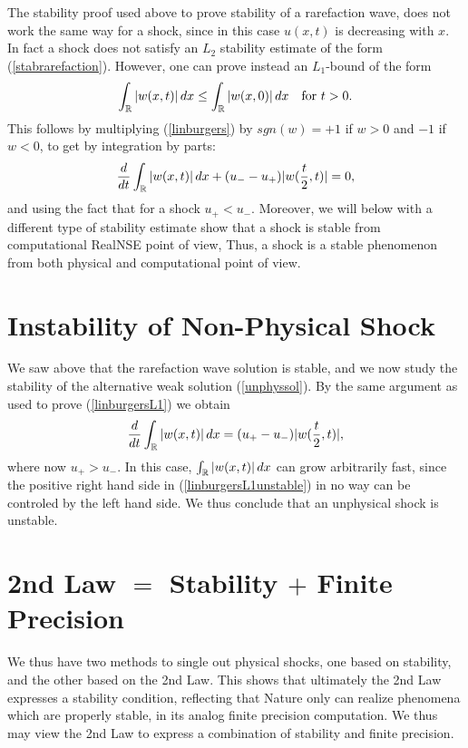 The stability proof used above to prove stability of a rarefaction
wave, does not work the same way for a shock, since in this case
$u(x,t)$ is decreasing with $x$. In fact a shock does not satisfy an
$L_2$ stability estimate of the form (\ref{stabrarefaction}). However,
one can prove instead an $L_1$-bound of the form
\begin{equation}\label{stabshock}
\int_{\mathbb{R}} \vert w(x,t)\vert\, dx\le \int_{\mathbb{R}} \vert w(x,0)\vert
\, dx\quad\mbox{for }t>0.
\end{equation}
This follows by multiplying (\ref{linburgers}) by $sgn (w)=+1$ if $w>0$ 
and $-1$ if $w<0$, to get by integration by parts:
\begin{equation}\label{linburgersL1}
\frac{d}{dt}
\int_{\mathbb{R}}\vert w(x,t)\vert\, dx +(u_--u_+)\vert w(\frac{t}{2},t)\vert =0,
\end{equation}
and using the fact that for a shock $u_+<u_-$.
Moreover, we will below with a different type of stability estimate
show that a shock is stable from computational RealNSE point of view, 
Thus, a shock is a stable phenomenon from both physical and computational
point of view.


\section{Instability of Non-Physical Shock}

We saw above that the rarefaction wave solution is stable, and we now
study the stability of the alternative weak solution (\ref{unphyssol}).
By the same argument as used to prove (\ref{linburgersL1}) we obtain
\begin{equation}\label{linburgersL1unstable}
\frac{d}{dt}\int_{\mathbb{R}}\vert w(x,t)\vert\, dx =(u_+-u_-)\vert w(\frac{t}{2},t)\vert , 
\end{equation}
where now $u_+>u_-$. In this case, $\int_{\mathbb{R}}\vert w(x,t)\vert\, dx$
can grow arbitrarily fast, since the positive right hand side
in (\ref{linburgersL1unstable}) in no way can
be controled by the left hand side. We thus conclude that an 
unphysical shock is unstable.

\section{2nd Law $=$ Stability $+$ Finite Precision}
We thus have two methods
to single out physical shocks, one based on stability,
and the other based on the 2nd Law. This shows that ultimately the 2nd Law
expresses a stability condition, reflecting that Nature only can realize
phenomena which are properly stable, in its analog finite precision
computation. We thus may view the 2nd Law to express 
a combination of stability and finite precision.   



